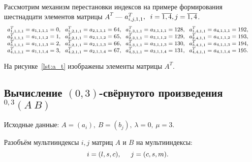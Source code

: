 Рассмотрим механизм перестановки индексов на примере формирования шестнадцати
элементов матрицы $A^T$ --- $a^T_{i,j,1,1}, \hspace{2mm} i = \overline{1,4}, j = \overline{1,4}$.
\[
\small{
  \begin{array}{lc}
    \begin{matrix}
      a^T_{1,1,1,1} = a_{1,1,1,1} = 0, \hspace{2mm}
      a^T_{1,2,1,1} = a_{2,1,1,1} = 64, \hspace{2mm} 
      a^T_{1,3,1,1} = a_{3,1,1,1} = 128, \hspace{2mm}
      a^T_{1,4,1,1} = a_{4,1,1,1} = 192,
      \\
      a^T_{2,1,1,1} = a_{1,1,1,2} = 1, \hspace{2mm}
      a^T_{2,2,1,1} = a_{2,1,1,2} = 65, \hspace{2mm} 
      a^T_{2,3,1,1} = a_{3,1,1,2} = 129, \hspace{2mm}
      a^T_{2,4,1,1} = a_{4,1,1,2} = 193,
      \\
      a^T_{3,1,1,1} = a_{1,1,1,3} = 2, \hspace{2mm}
      a^T_{3,2,1,1} = a_{2,1,1,3} = 66, \hspace{2mm} 
      a^T_{3,3,1,1} = a_{3,1,1,3} = 130, \hspace{2mm}
      a^T_{3,4,1,1} = a_{4,1,1,3} = 194,
      \\
      a^T_{4,1,1,1} = a_{1,1,1,4} = 3, \hspace{2mm}
      a^T_{4,2,1,1} = a_{2,1,1,4} = 67, \hspace{2mm} 
      a^T_{4,3,1,1} = a_{3,1,1,4} = 131, \hspace{2mm}
      a^T_{4,4,1,1} = a_{4,1,1,4} = 195.
    \end{matrix}
  \end{array}
}
\]

На рисунке~\ref{lst:a_t} изображены элементы матрицы $A^T$.



\subsection{Вычисление $(0,3)$-свёрнутого произведения ${}^{0, 3}(A \: B)$}

Исходные данные: $A = (a_i), \: B = (b_j), \: \lambda = 0, \: \mu = 3$.

Разобъём мультииндексы $i, j$ матриц $A$ и $B$ на мультииндексы:
\begin{equation*}
  i = (l, s, c), \hspace{5mm} j = (c, s, m).
\end{equation*}

